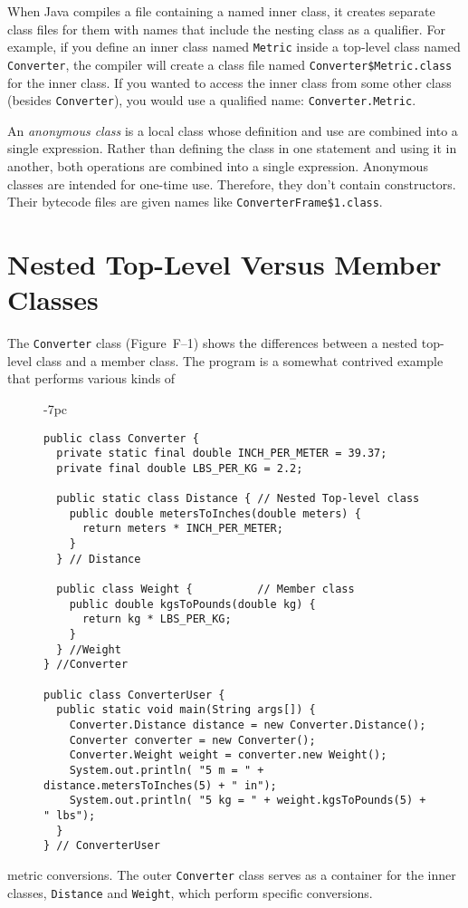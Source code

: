 When Java compiles a file containing a named inner class, it creates
separate class files for them with names that include the nesting
class as a qualifier.  For example, if you define an inner class named
{\tt Metric} inside a top-level class named {\tt Converter}, the
compiler will create a class file named {\tt Converter\$Metric.class}
for the inner class.   If you wanted to access the inner class from
some other class (besides {\tt Converter}), you would use a qualified
name: {\tt Converter.Metric}.


An {\it anonymous class} is a local class whose definition and use are
combined into a single expression.  Rather than defining the class in
one statement and using it in another, both operations are combined
into a single expression.  Anonymous classes are intended for one-time
use.  Therefore, they don't contain constructors.  Their bytecode files
are given names like {\tt ConverterFrame\$1.class}.

\section*{Nested Top-Level Versus Member Classes}
\noindent The {\tt Converter} class (Figure~F--1) shows the
differences between a nested top-level class and a member class.   The
program is a somewhat contrived example that performs various kinds of
\begin{figure}[h!]
\jjjprogstart
\begin{jjjlistingleft}[33pc]{-7pc}
\begin{lstlisting}
public class Converter {
  private static final double INCH_PER_METER = 39.37;
  private final double LBS_PER_KG = 2.2;

  public static class Distance { // Nested Top-level class
    public double metersToInches(double meters) {
      return meters * INCH_PER_METER;
    }
  } // Distance

  public class Weight {          // Member class
    public double kgsToPounds(double kg) {
      return kg * LBS_PER_KG;
    }
  } //Weight
} //Converter

public class ConverterUser {
  public static void main(String args[]) {
    Converter.Distance distance = new Converter.Distance();
    Converter converter = new Converter();
    Converter.Weight weight = converter.new Weight();
    System.out.println( "5 m = " + distance.metersToInches(5) + " in");
    System.out.println( "5 kg = " + weight.kgsToPounds(5) + " lbs");
  }
} // ConverterUser
\end{lstlisting}
\end{jjjlistingleft}
\end{figure}
metric conversions.  The outer {\tt Converter} class serves as a
container for the inner classes, {\tt Distance} and {\tt Weight},
which perform specific conversions.


